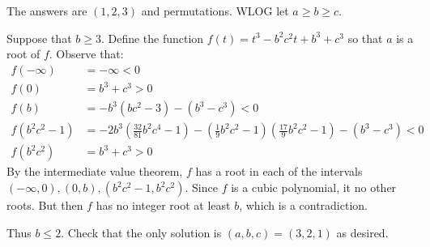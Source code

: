 The answers are $(1,2,3)$ and permutations. WLOG let $a\geq b\geq c$.

Suppose that $b\geq3$. Define the function $f(t)=t^3-b^2c^2t+b^3+c^3$ so that $a$ is a root of $f$. Observe that:
\begin{align*}
	f(-\infty) &= -\infty < 0 \\
	f(0) &= b^3+c^3 > 0 \\
	f(b) &= -b^3(bc^2-3)-(b^3-c^3) < 0 \\
	f(b^2c^2-1) &= -2b^3(\frac{32}{81}b^2c^4-1)-(\frac{1}{9}b^2c^2-1)(\frac{17}{9}b^2c^2-1)-(b^3-c^3) < 0 \\
	f(b^2c^2) &= b^3+c^3 > 0
\end{align*}
By the intermediate value theorem, $f$ has a root in each of the intervals $(-\infty,0),(0,b),(b^2c^2-1,b^2c^2)$. Since $f$ is a cubic polynomial, it no other roots. But then $f$ has no integer root at least $b$, which is a contradiction.

Thus $b\leq2$. Check that the only solution is $(a,b,c)=(3,2,1)$ as desired.
